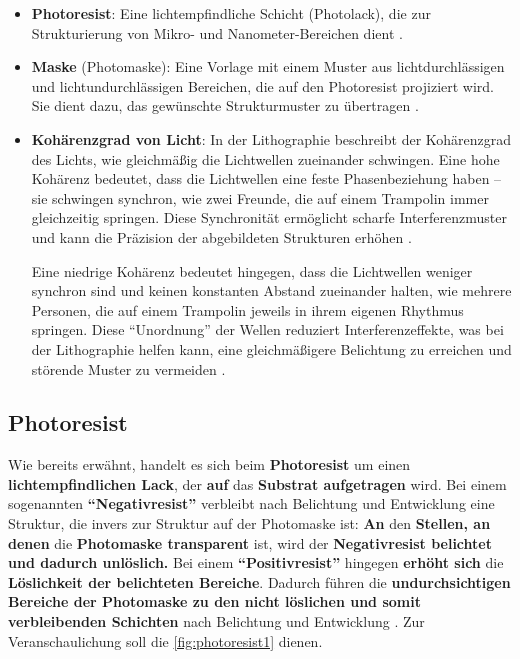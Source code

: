 \documentclass{article} %
\begin{document}
\begin{itemize}
    \item \textbf{Photoresist}: Eine lichtempfindliche Schicht (Photolack), die zur Strukturierung von Mikro- und Nanometer-Bereichen dient \cite{madou2002}.
    \item \textbf{Maske} (Photomaske): Eine Vorlage mit einem Muster aus lichtdurchlässigen und lichtundurchlässigen Bereichen, die auf den Photoresist projiziert wird. Sie dient dazu, das gewünschte Strukturmuster zu übertragen \cite{wolf2000}.
    \item \textbf{Kohärenzgrad von Licht}: In der Lithographie beschreibt der Kohärenzgrad des Lichts, wie gleichmäßig die Lichtwellen zueinander schwingen. Eine hohe Kohärenz bedeutet, dass die Lichtwellen eine feste Phasenbeziehung haben -- sie schwingen synchron, wie zwei Freunde, die auf einem Trampolin immer gleichzeitig springen. Diese Synchronität ermöglicht scharfe Interferenzmuster und kann die Präzision der abgebildeten Strukturen erhöhen \cite{Mack2006, BornWolf1999}. 

    Eine niedrige Kohärenz bedeutet hingegen, dass die Lichtwellen weniger synchron sind und keinen konstanten Abstand zueinander halten, wie mehrere Personen, die auf einem Trampolin jeweils in ihrem eigenen Rhythmus springen. Diese ``Unordnung'' der Wellen reduziert Interferenzeffekte, was bei der Lithographie helfen kann, eine gleichmäßigere Belichtung zu erreichen und störende Muster zu vermeiden \cite{Mack2006}.
\end{itemize}





\vspace{1em}

\subsection{Photoresist}

Wie bereits erwähnt, handelt es sich beim \textbf{Photoresist} um einen \textbf{lichtempfindlichen Lack}, der \textbf{auf} das \textbf{Substrat aufgetragen} wird. Bei einem sogenannten \textbf{``Negativresist''} verbleibt nach Belichtung und Entwicklung eine Struktur, die invers zur Struktur auf der Photomaske ist: \textbf{An} den \textbf{Stellen, an denen} die \textbf{Photomaske transparent} ist, wird der \textbf{Negativresist belichtet und dadurch unlöslich.} Bei einem \textbf{``Positivresist''} hingegen \textbf{erhöht sich} die \textbf{Löslichkeit der belichteten Bereiche}. Dadurch führen die \textbf{undurchsichtigen Bereiche der Photomaske zu den nicht löslichen und somit verbleibenden Schichten} nach Belichtung und Entwicklung \cite{gerald2006}. Zur Veranschaulichung soll die \autoref{fig:photoresist1} dienen.
\end{document}
